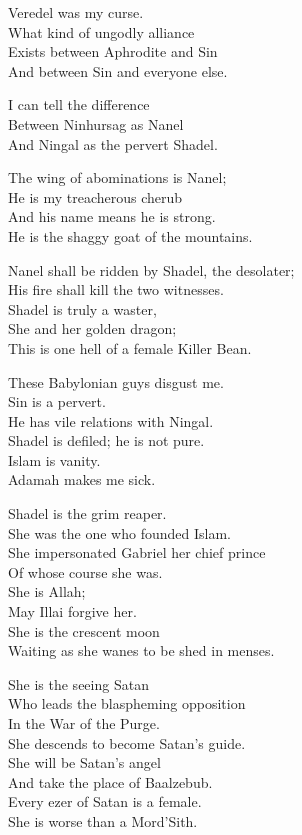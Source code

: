 \documentclass[
]{book}
\begin{document}
Veredel was my curse.\\
What kind of ungodly alliance\\
Exists between Aphrodite and Sin\\
And between Sin and everyone else.

I can tell the difference\\
Between Ninhursag as Nanel\\
And Ningal as the pervert Shadel.

The wing of abominations is Nanel;\\
He is my treacherous cherub\\
And his name means he is strong.\\
He is the shaggy goat of the mountains.

Nanel shall be ridden by Shadel, the desolater;\\
His fire shall kill the two witnesses.\\
Shadel is truly a waster,\\
She and her golden dragon;\\
This is one hell of a female Killer Bean.

These Babylonian guys disgust me.\\
Sin is a pervert.\\
He has vile relations with Ningal.\\
Shadel is defiled; he is not pure.\\
Islam is vanity.\\
Adamah makes me sick.

Shadel is the grim reaper.\\
She was the one who founded Islam.\\
She impersonated Gabriel her chief prince\\
Of whose course she was.\\
She is Allah;\\
May Illai forgive her.\\
She is the crescent moon\\
Waiting as she wanes to be shed in menses.

She is the seeing Satan\\
Who leads the blaspheming opposition\\
In the War of the Purge.\\
She descends to become Satan's guide.\\
She will be Satan's angel\\
And take the place of Baalzebub.\\
Every ezer of Satan is a female.\\
She is worse than a Mord'Sith.
\end{document}
